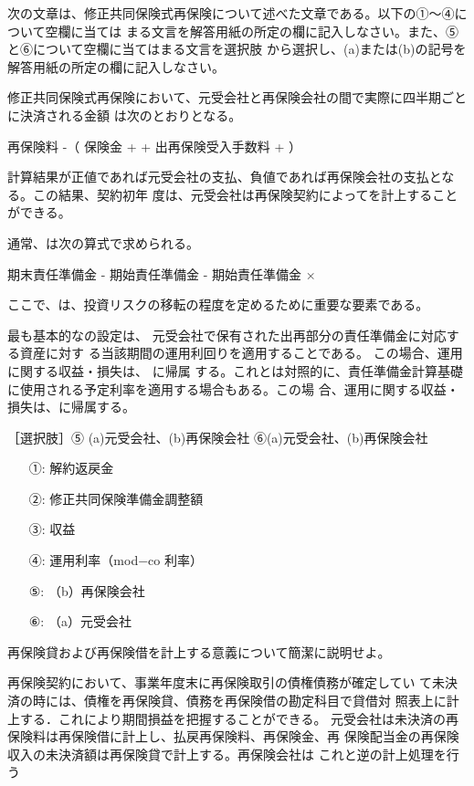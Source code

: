 \documentclass[report,gutter=10mm,fore-edge=10mm,uplatex,dvipdfmx]{jlreq}
\begin{document}
次の文章は、修正共同保険式再保険について述べた文章である。以下の①～④について空欄に当ては
まる文言を解答用紙の所定の欄に記入しなさい。また、⑤と⑥について空欄に当てはまる文言を選択肢
から選択し、(a)または(b)の記号を解答用紙の所定の欄に記入しなさい。

修正共同保険式再保険において、元受会社と再保険会社の間で実際に四半期ごとに決済される金額
は次のとおりとなる。

再保険料 -（ 保険金 +   + 出再保険受入手数料 +  ）

計算結果が正値であれば元受会社の支払、負値であれば再保険会社の支払となる。この結果、契約初年
度は、元受会社は再保険契約によってを計上することができる。

通常、は次の算式で求められる。

期末責任準備金 - 期始責任準備金 - 期始責任準備金 ×

ここで、は、投資リスクの移転の程度を定めるために重要な要素である。

最も基本的なの設定は、
元受会社で保有された出再部分の責任準備金に対応する資産に対す
る当該期間の運用利回りを適用することである。
この場合、運用に関する収益・損失は、 に帰属
する。これとは対照的に、責任準備金計算基礎に使用される予定利率を適用する場合もある。この場
合、運用に関する収益・損失は、に帰属する。

［選択肢］⑤ (a)元受会社、(b)再保険会社    ⑥(a)元受会社、(b)再保険会社

\answer{}

\begin{itemize}
\item[ ①: ] 解約返戻金
\item[ ②: ] 修正共同保険準備金調整額
\item[ ③: ] 収益
\item[ ④: ] 運用利率（mod−co 利率）
\item[ ⑤: ] （b）再保険会社
\item[ ⑥: ] （a）元受会社
\end{itemize}

再保険貸および再保険借を計上する意義について簡潔に説明せよ。

\answer{}
再保険契約において、事業年度末に再保険取引の債権債務が確定してい
て未決済の時には、債権を再保険貸、債務を再保険借の勘定科目で貸借対
照表上に計上する．これにより期間損益を把握することができる。
元受会社は未決済の再保険料は再保険借に計上し、払戻再保険料、再保険金、再
保険配当金の再保険収入の未決済額は再保険貸で計上する。再保険会社は
これと逆の計上処理を行う
\end{document}
